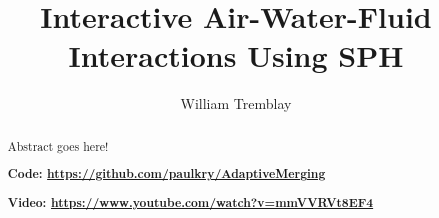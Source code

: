 \documentclass[acmtog,review]{acmart}
\begin{document}
\title{Interactive Air-Water-Fluid Interactions Using SPH}

\author{William Tremblay}

\renewcommand\shortauthors{Last, F.}

\begin{abstract}
Abstract goes here! \lipsum[1]

\vspace{1em}
{\bf Code: \url{https://github.com/paulkry/AdaptiveMerging}}

{\bf Video: \url{https://www.youtube.com/watch?v=mmVVRVt8EF4}}

\end{abstract}


%
%


%
%

\end{document}
